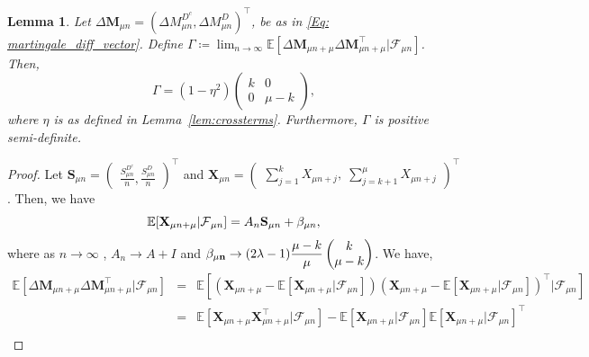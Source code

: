 \documentclass{article}
\numberwithin{equation}{section}
\newtheorem{lemma}[theorem]{Lemma}
\newcommand{\FF}{\mbox{${\mathcal F}$}}
\newcommand{\1}{\mathbf{1}}
\newcommand{\0}{\mathbf{0}}
\newcommand{\bM}{\mathbf{M}}
\newcommand{\E}{\mbox{${\mathbb E}$}}
\begin{document}
\begin{lemma}
\label{lem:Gamma}
Let $ \Delta \bM_{ \mu{n}}= \left(\Delta M_{\mu n}^{D^c}, \Delta M_{\mu n}^{D}\right)^\top$,
be as in \eqref{Eq: martingale_diff_vector}. 
Define $\Gamma \coloneqq\lim_{n \to \infty}  \E[ \Delta {\mathbf{M}}_{\mu n + \mu}  \Delta {\mathbf{M}}^\top_{\mu n + \mu} \vert \FF_{\mu n}]$. Then,
\[ \Gamma = (1-\eta^2) \begin{pmatrix}
     k & 0\\
     0 & \mu - k
 \end{pmatrix}, \]
where $\eta$ is as defined in Lemma~\ref{lem:crossterms}. Furthermore, $\Gamma$ is positive semi-definite. 
\end{lemma}
\begin{proof}
Let ${\mathbf{S}}_{\mu n} = \begin{pmatrix} \frac{S^{D^c}_{\mu n}}{n}, \frac{S^{D}_{\mu n}}{n} \end{pmatrix}^\top$ and ${\mathbf{X}}_{\mu n} = \begin{pmatrix} \sum_{j=1}^{k} X_{\mu n+j}, \; \sum_{j=k+1}^{\mu} X_{\mu n + j} \end{pmatrix}^\top$. Then, %
we have
\[ \E[{\mathbf{X}}_{\mu n + \mu} \vert \FF_{\mu n}] = A_n {\mathbf{S}}_{\mu n} + {\bf \beta}_{\mu n}, \] 
where as $n \to \infty$ , $A_n \to A + I$ and ${\bf \beta_{\mu n}} \to (2 \lambda -1) \dfrac{\mu-k}{\mu} \begin{pmatrix} k \\ \mu-k \end{pmatrix}$. We have,
\begin{eqnarray*}
  \E[ \Delta {\mathbf{M}}_{\mu n + \mu}  \Delta {\mathbf{M}}^\top_{\mu n + \mu} \vert \FF_{\mu n}] &=& \E\left[ \left( {\mathbf{X}_{\mu n + \mu}} - \E[{\mathbf{X}_{\mu n + \mu}} \vert \FF_{\mu n}] \right)   \left( {\mathbf{X}_{\mu n + \mu}} - \E[{\mathbf{X}_{\mu n + \mu}} \vert \FF_{\mu n}] \right)^\top \vert \FF_{\mu n} \right]   \\
  &=& \E\left[ {\mathbf{X}_{\mu n + \mu}}{\mathbf{X}^\top_{\mu n + \mu}}  \vert \FF_{\mu n} \right] - \E[{\mathbf{X}_{\mu n + \mu}} \vert \FF_{\mu n}] \E[{\mathbf{X}_{\mu n + \mu}} \vert \FF_{\mu n}]^\top     \\

\end{eqnarray*}
\end{proof}
\end{document}
